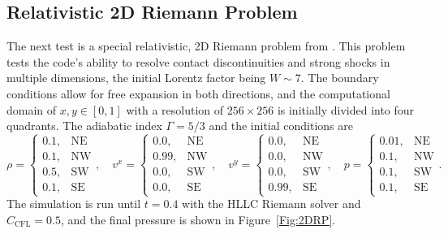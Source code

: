 \documentclass[letterpaper]{jpconf}
\newcommand{\figref}[1]{Figure~\ref{#1}}
\begin{document}
\subsection{Relativistic 2D Riemann Problem}
The next test is a special relativistic, 2D Riemann problem from \cite{DelZannaBucciantini2002}. This problem tests the code's ability to resolve contact discontinuities and strong shocks in multiple dimensions, the initial Lorentz factor being $W\sim7$. The boundary conditions allow for free expansion in both directions, and the computational domain of $x,y\in\left[0,1\right]$ with a resolution of $256\times256$ is initially divided into four quadrants. The adiabatic index $\Gamma=5/3$ and the initial conditions are
 \begin{equation}
 \rho=\begin{cases}0.1,&\text{NE}\\0.1,&\text{NW}\\0.5,&\text{SW}\\0.1,&\text{SE}\end{cases},\hspace{1em}v^{x}=\begin{cases}0.0,&\text{NE}\\0.99,&\text{NW}\\0.0,&\text{SW}\\0.0,&\text{SE}\end{cases},\hspace{1em}v^{y}=\begin{cases}0.0,&\text{NE}\\0.0,&\text{NW}\\0.0,&\text{SW}\\0.99,&\text{SE}\end{cases},\hspace{1em}p=\begin{cases}0.01,&\text{NE}\\0.1,&\text{NW}\\0.1,&\text{SW}\\0.1,&\text{SE}\end{cases}.
 \end{equation}
The simulation is run until $t=0.4$ with the HLLC Riemann solver and $C_{\text{CFL}}=0.5$, and the final pressure is shown in \figref{Fig:2DRP}.
\end{document}
